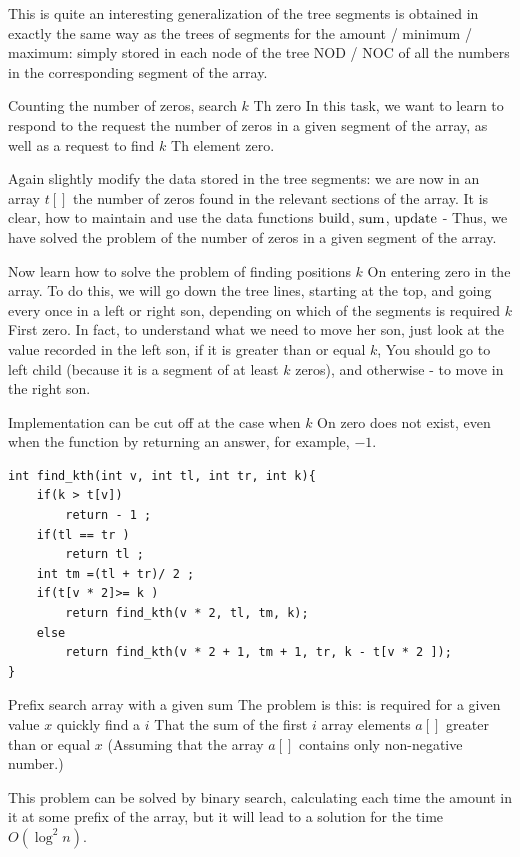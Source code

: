 This is quite an interesting generalization of the tree segments is obtained in exactly the same way as the trees of segments for the amount / minimum / maximum: simply stored in each node of the tree NOD / NOC of all the numbers in the corresponding segment of the array.

Counting the number of zeros, search $k$ Th zero
In this task, we want to learn to respond to the request the number of zeros in a given segment of the array, as well as a request to find $k$ Th element zero.

Again slightly modify the data stored in the tree segments: we are now in an array $t []$ the number of zeros found in the relevant sections of the array. It is clear, how to maintain and use the data functions $\rm build$, $\rm sum$, $\rm update$ - Thus, we have solved the problem of the number of zeros in a given segment of the array.

Now learn how to solve the problem of finding positions $k$ On entering zero in the array. To do this, we will go down the tree lines, starting at the top, and going every once in a left or right son, depending on which of the segments is required $k$ First zero. In fact, to understand what we need to move her son, just look at the value recorded in the left son, if it is greater than or equal $k$, You should go to left child (because it is a segment of at least $k$ zeros), and otherwise - to move in the right son.

Implementation can be cut off at the case when $k$ On zero does not exist, even when the function by returning an answer, for example, $-1$.

\begin{verbatim}
int find_kth(int v, int tl, int tr, int k){
    if(k > t[v])
        return - 1 ;
    if(tl == tr )
        return tl ;
    int tm =(tl + tr)/ 2 ;
    if(t[v * 2]>= k )
        return find_kth(v * 2, tl, tm, k);
    else
        return find_kth(v * 2 + 1, tm + 1, tr, k - t[v * 2 ]);
} 
\end{verbatim}
Prefix search array with a given sum
The problem is this: is required for a given value $x$ quickly find a $i$ That the sum of the first $i$ array elements $a []$ greater than or equal $x$ (Assuming that the array $a []$ contains only non-negative number.)

This problem can be solved by binary search, calculating each time the amount in it at some prefix of the array, but it will lead to a solution for the time $O (\log ^ 2 n)$.

